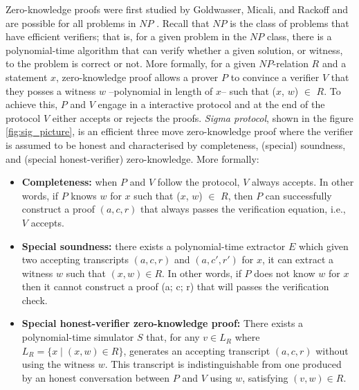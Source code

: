\documentclass[conference,compsoc]{IEEEtran}
\begin{document}
Zero-knowledge proofs were first studied by Goldwasser, Micali, and Rackoff \cite{10.1145/22145.22178} and 
are possible for all problems in $NP$ \cite{10.1145/116825.116852}. Recall that $NP$ is the class of 
problems that have efficient verifiers; that is, for a given problem in the $NP$ class, there is 
a polynomial-time algorithm that can verify whether a given solution, or witness, to the problem is correct or not.
More formally, for a given $NP$-relation $R$ and a statement $x$, zero-knowledge proof allows a prover 
$P$ to convince a verifier $V$ that they posses a witness $w$ --polynomial in length of $x$-- such 
that ($x$, $w$) $\in$ $R$. To achieve this, $P$ and $V$ engage in a 
interactive protocol and  at the end of the protocol $V$ either accepts or rejects the proofs.
\textit{Sigma protocol}, shown in the figure \ref{fig:sig_picture}, is an efficient three move zero-knowledge proof where the 
verifier is assumed to be honest and characterised by completeness, (special) soundness, and 
(special honest-verifier) zero-knowledge. More formally: 
\begin{itemize}
  \item \textbf{Completeness:}
  when $P$ and $V$ follow the protocol, $V$ always accepts. 
  In other words, if $P$ knows $w$ for $x$ such that ($x$, $w$) $\in$ $R$,  
  then $P$ can successfully construct a proof $(a, c, r)$ that always passes the verification equation, 
  i.e., $V$ accepts. 

\item \textbf{Special soundness:}
there exists a polynomial-time extractor $E$ which given 
two accepting transcripts $(a, c, r)$ and $(a, c', r')$ for $x$, 
it can extract a witness $w$ such that $(x, w) \in R$. In other words, 
if $P$ does not know $w$ for $x$ then it cannot construct a proof 
(a; c; r) that will passes the verification check. 
\item \textbf{Special honest-verifier zero-knowledge proof:}
There exists a polynomial-time simulator $S$ that, for any 
$v \in L_R$ where $L_R = \{x  \mid (x, w) \in R\}$,
generates an accepting transcript $(a, c, r)$ 
without using the witness $w$. 
This transcript is indistinguishable from one produced by an 
honest conversation between $P$ and $V$ using $w$, 
satisfying $(v,w) \in R$.

\end{itemize}
\end{document}
